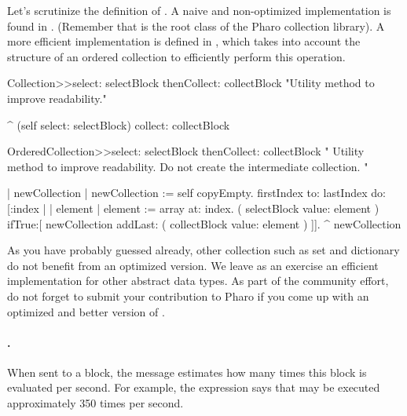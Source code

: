 \documentclass[a4paper,10pt,twoside]{book}
\begin{document}
Let's scrutinize the definition of . A naive and non-optimized implementation is found in . (Remember that  is the root class of the Pharo collection library). A more efficient implementation is defined in , which takes into account the structure of an ordered collection to efficiently perform this operation.

\begin{code}{}
Collection>>select: selectBlock thenCollect: collectBlock
	"Utility method to improve readability."

	^ (self select: selectBlock) collect: collectBlock
\end{code}

\begin{code}{}
OrderedCollection>>select: selectBlock thenCollect: collectBlock
    " Utility method to improve readability.
	Do not create the intermediate collection. "

	| newCollection |
    newCollection := self copyEmpty.
    firstIndex to: lastIndex do:[:index |
		| element |
		element := array at: index.
		( selectBlock value: element ) 
			ifTrue:[ newCollection addLast: ( collectBlock value: element ) ]].
    ^ newCollection
\end{code}

As you have probably guessed already, other collection such as set and dictionary do not benefit from an optimized version. We leave as an exercise an efficient implementation for other abstract data types. As part of the community effort, do not forget to submit your contribution to Pharo if you come up with an optimized and better version of .


\paragraph{.} When sent to a block, the  message estimates how many times this block is evaluated per second. For example, the expression  says that  may be executed approximately 350 times per second.
\end{document}

